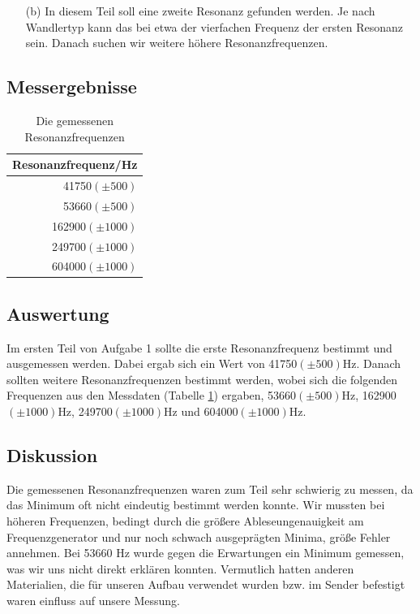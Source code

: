 \documentclass[12pt]{scrartcl}
\begin{document}
\begin{itemize}
\begin{figure}[htbp]
  	\caption[Schaltskizze des Versuchsaufbaus]{Schaltskizze des Versuchsaufbaus\footnotemark}
  \label{fig:impedanz}
\end{figure}
Wir verändern dann die Frequenz des Funktionsgenerators und messen die niedrigste Resonanzfrequenz (etwa 40 kHz)
aus. Im Resonanzfall erwarten wir maximalen Strom durch den 1-k$\Omega$-Widerstand. 
\item[(b)]
In diesem Teil soll eine zweite Resonanz gefunden werden. Je nach Wandlertyp kann das bei etwa der vierfachen Frequenz der ersten Resonanz sein. Danach suchen wir weitere höhere
Resonanzfrequenzen.
\end{itemize}
\subsection{Messergebnisse}
\begin{table}[H]
\caption{Die gemessenen Resonanzfrequenzen}
\begin{center}
\begin{tabular}{|r|}
\hline
Resonanzfrequenz/Hz \\ \hline
41750$(\pm 500)$ \\ \hline
53660$(\pm 500)$ \\ \hline
162900$(\pm 1000)$ \\ \hline
249700$(\pm 1000)$ \\ \hline
604000$(\pm 1000)$ \\ \hline
\end{tabular}
\end{center}
\label{tab:aufgabe1}
\end{table}
\subsection{Auswertung}
Im ersten Teil von Aufgabe 1 sollte die erste Resonanzfrequenz bestimmt und ausgemessen werden. Dabei ergab sich ein Wert von 41750$(\pm 500)$Hz. Danach sollten weitere Resonanzfrequenzen bestimmt werden, wobei sich die folgenden Frequenzen  aus den Messdaten (Tabelle \ref{tab:aufgabe1}) ergaben, 53660$(\pm 500)$Hz, 162900$(\pm 1000)$Hz, 249700$(\pm 1000)$Hz und 604000$(\pm 1000)$Hz.
\subsection{Diskussion}
Die gemessenen Resonanzfrequenzen waren zum Teil sehr schwierig zu messen, da das Minimum oft nicht eindeutig bestimmt werden konnte.
Wir mussten bei höheren Frequenzen, bedingt durch die größere Ableseungenauigkeit am Frequenzgenerator und nur noch schwach ausgeprägten Minima, größe Fehler annehmen.
Bei 53660 Hz wurde gegen die Erwartungen ein Minimum gemessen, was wir uns nicht direkt erklären konnten. Vermutlich hatten anderen Materialien, die für unseren Aufbau verwendet wurden bzw. im Sender befestigt waren einfluss auf unsere Messung. 
\end{document}

